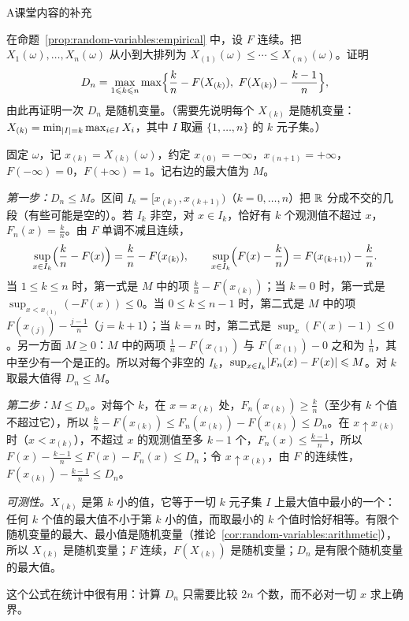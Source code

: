 \begin{exercises}{A}{课堂内容的补充}
\item\label{ex:random-variables:A13} 在命题~\ref{prop:random-variables:empirical} 中，设 $F$ 连续。把 $X_1(\omega),\dots,X_n(\omega)$ 从小到大排列为 $X_{(1)}(\omega)\leqslant\cdots\leqslant X_{(n)}(\omega)$。证明
\[
D_n=\max_{1\leqslant k\leqslant n}\max\Bigl\{\frac kn-F(X_{(k)}),\ F(X_{(k)})-\frac{k-1}n\Bigr\},
\]
由此再证明一次 $D_n$ 是随机变量。（需要先说明每个 $X_{(k)}$ 是随机变量：$X_{(k)}=\min_{\lvert I\rvert=k}\max_{i\in I}X_i$，其中 $I$ 取遍 $\{1,\dots,n\}$ 的 $k$ 元子集。）
\begin{solution}
固定 $\omega$，记 $x_{(k)}=X_{(k)}(\omega)$，约定 $x_{(0)}=-\infty$，$x_{(n+1)}=+\infty$，$F(-\infty)=0$，$F(+\infty)=1$。记右边的最大值为 $M$。

\emph{第一步：$D_n\leqslant M$。}区间 $I_k=[x_{(k)},x_{(k+1)})$（$k=0,\dots,n$）把 $\mathbb{R}$ 分成不交的几段（有些可能是空的）。若 $I_k$ 非空，对 $x\in I_k$，恰好有 $k$ 个观测值不超过 $x$，$F_n(x)=\frac kn$。由 $F$ 单调不减且连续，
\[
\sup_{x\in I_k}\Bigl(\frac kn-F(x)\Bigr)=\frac kn-F(x_{(k)}),\qquad\sup_{x\in I_k}\Bigl(F(x)-\frac kn\Bigr)=F(x_{(k+1)})-\frac kn .
\]
当 $1\leqslant k\leqslant n$ 时，第一式是 $M$ 中的项 $\frac kn-F(x_{(k)})$；当 $k=0$ 时，第一式是 $\sup_{x<x_{(1)}}(-F(x))\leqslant0$。当 $0\leqslant k\leqslant n-1$ 时，第二式是 $M$ 中的项 $F(x_{(j)})-\frac{j-1}n$（$j=k+1$）；当 $k=n$ 时，第二式是 $\sup_x(F(x)-1)\leqslant0$。另一方面 $M\geqslant0$：$M$ 中的两项 $\frac1n-F(x_{(1)})$ 与 $F(x_{(1)})-0$ 之和为 $\frac1n$，其中至少有一个是正的。所以对每个非空的 $I_k$，$\sup_{x\in I_k}\lvert F_n(x)-F(x)\rvert\leqslant M$。对 $k$ 取最大值得 $D_n\leqslant M$。

\emph{第二步：$M\leqslant D_n$。}对每个 $k$，在 $x=x_{(k)}$ 处，$F_n(x_{(k)})\geqslant\frac kn$（至少有 $k$ 个值不超过它），所以 $\frac kn-F(x_{(k)})\leqslant F_n(x_{(k)})-F(x_{(k)})\leqslant D_n$。在 $x\uparrow x_{(k)}$ 时（$x<x_{(k)}$），不超过 $x$ 的观测值至多 $k-1$ 个，$F_n(x)\leqslant\frac{k-1}n$，所以 $F(x)-\frac{k-1}n\leqslant F(x)-F_n(x)\leqslant D_n$；令 $x\uparrow x_{(k)}$，由 $F$ 的连续性，$F(x_{(k)})-\frac{k-1}n\leqslant D_n$。

\emph{可测性。}$X_{(k)}$ 是第 $k$ 小的值，它等于一切 $k$ 元子集 $I$ 上最大值中最小的一个：任何 $k$ 个值的最大值不小于第 $k$ 小的值，而取最小的 $k$ 个值时恰好相等。有限个随机变量的最大、最小值是随机变量（推论~\ref{cor:random-variables:arithmetic}），所以 $X_{(k)}$ 是随机变量；$F$ 连续，$F(X_{(k)})$ 是随机变量；$D_n$ 是有限个随机变量的最大值。

这个公式在统计中很有用：计算 $D_n$ 只需要比较 $2n$ 个数，而不必对一切 $x$ 求上确界。
\end{solution}


\end{exercises}
